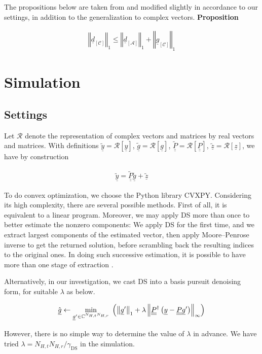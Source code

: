 \documentclass[journal]{IEEEtran}
\newcommand {\g} {\gamma}
\renewcommand {\l} {\lambda}
\newcommand {\Adj} {\dagger}
\newcommand {\m} [1] {\( #1 \)}
\newcommand {\V} [1] {\underline {#1}}
\newcommand {\M} [1] {\underline {\underline {#1}}}
\newcommand {\RB} [1] {\left( #1 \right)}
\newcommand {\SB} [1] {\left[ #1 \right]}
\newcommand {\VNm} [1] {\left \Vert #1 \right \Vert}
\newcommand {\Min} [1] {\underset {#1} {\mathrm {min}}\;}
\newcommand {\Disp} [1] {
   \begin {align*}
      #1
   \end {align*}
}
\begin{document}
The propositions below are taken from \cite {CaT07} and modified slightly in accordance to our settings, in addition to the generalization to complex vectors.
%
\textbf {Proposition}
{
\Disp {
\VNm {\V {d} _{\SB{\mathcal {C}}}} _1
\leq \VNm {\V {d} _{\SB{\mathcal {A}}}} _1
+\VNm {\V {g} _{\SB{\mathcal {C}}}} _1 
}



\section{Simulation}

\subsection{Settings}

Let \m {\mathcal {R}} denote the representation of complex vectors and matrices by real vectors and matrices.
With definitions \m {\tilde {\V {y}} = \mathcal {R} \SB {\V {y}}},
\m {\tilde {\V {g}} = \mathcal {R} \SB {\V {g}}},
\m {\tilde {\M {P}} = \mathcal {R} \SB {\M {P}}},
\m {\tilde {\V {z}} = \mathcal {R} \SB {\V {z}}},
we have by construction
%
\Disp {
\V {\tilde {y}}
= \M {\tilde {P}} \V {\tilde {g}} +\V {\tilde {z}} 
}


To do convex optimization, we choose the Python library CVXPY.
Considering its high complexity, there are several possible methods.
First of all, it is equivalent to a linear program.
Moreover, we may apply DS more than once to better estimate the nonzero components:
We apply DS for the first time, and we extract largest components of the estimated vector, then apply Moore–Penrose inverse to get the returned solution, before scrambling back the resulting indices to the original ones.
In doing such successive estimation, it is possible to have more than one stage of extraction \cite {CaT07}.

Alternatively, in our investigation, we cast DS into a basis pursuit denoising form, for suitable \m {\l} \cite {BoV04} as below.

\Disp {
\Hat {\V {g}}
\leftarrow \Min {\V {g}' \in \mathbb {C} ^{N_{H,t} N_{H,r}}}
\RB {\VNm {\V {g}'} _1 + \l \VNm {\M {P}^\Adj \RB {\V {y} -\M {P} \V {g}'}} _\infty}
}

However, there is no simple way to determine the value of \m {\l} in advance.
We have tried \m {\l = N_{H,t} N_{H,r} / \g_{\mathrm {DS}}} in the simulation.

}
\end{document}
